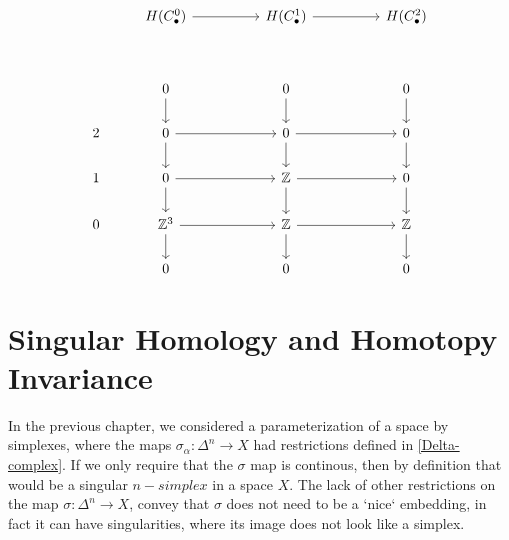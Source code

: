 \documentclass[11pt,a4paper]{report}
\begin{document}
       \[
     \begin{tikzcd}[ampersand replacement=\&]
            \& H(C_\bullet^0)   \arrow[rr]                                     \&  \& H(C_\bullet^1) \arrow[rr]                               \&  \& H(C_\bullet^2)                                                                 \\ \\
            \& 0 \arrow[d]                                         \&  \& 0 \arrow[d]                                         \&  \& 0 \arrow[d]                                                                 \\
            2 \& 0 \arrow[rr] \arrow[d]            \&  \& 0 \arrow[rr] \arrow[d]            \&  \& 0 \arrow[d] \\
            1 \& 0 \arrow[d] \arrow[rr]            \&  \& \mathbb{Z} \arrow[rr] \arrow[d]                   \&  \& 0 \arrow[d]                                              \\
            0 \& \mathbb{Z}^3 \arrow[d] \arrow[rr] \&  \& \mathbb{Z} \arrow[rr] \arrow[d] \&  \& \mathbb{Z} \arrow[d]                                    \\
            \& 0                                                   \&  \& 0                                                   \&  \& 0
    \end{tikzcd}
         \]

     \chapter{Singular Homology and Homotopy Invariance}
        \label{SingularHomology}


     In the previous chapter, we considered a parameterization of a space by simplexes, where the maps $\sigma_\alpha: \Delta^n \rightarrow X$ had restrictions defined in \ref{Delta-complex}. If we only require that the $\sigma$ map is continous, then by definition that would be a singular $n-simplex$ in a space $X$.
     The lack of other restrictions on the map $\sigma: \Delta^n \rightarrow X$, convey that $\sigma$ does not need to be a `nice` embedding, in fact it can have singularities, where its image does not look like a simplex.
\end{document}
